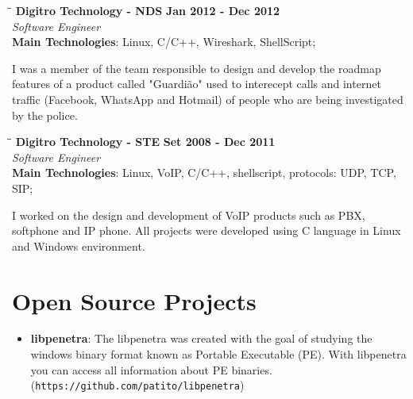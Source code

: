 \documentclass[margin]{res}
\begin{document}
\begin{resume}
   \begin{tabbing}
   \hspace{2.3in}\= \hspace{1.7in}\= \kill %
    \textbf{Digitro Technology - NDS}    \>\>\textbf{Jan 2012 - Dec 2012}\\
    \textit{Software Engineer}\\   
    \textbf{Main Technologies}: Linux, C/C++, Wireshark, ShellScript;
   \end{tabbing}\vspace{-20pt}      %
    \vspace{2mm}
    I was a member of the team responsible to design and develop the roadmap features of a product called
    "Guardião" used to interecept calls and internet traffic (Facebook, WhatsApp and Hotmail) of people who are 
    being investigated by the police.

   \begin{tabbing}
   \hspace{2.3in}\= \hspace{1.5in}\= \kill %
    \textbf{Digitro Technology - STE}    \>\>\textbf{Set 2008 - Dec 2011}\\
    \textit{Software Engineer}\\   
    \textbf{Main Technologies}: Linux, VoIP, C/C++, shellscript, protocols: UDP, TCP, SIP;
   \end{tabbing}\vspace{-20pt}      %
    \vspace{2mm}
    
    I worked on the design and development of VoIP products such as PBX, softphone and IP phone. 
    All projects were developed using C language in Linux and Windows environment.


\vspace{10mm}     

\section{Open Source Projects}
		\begin{itemize}
		    \vspace{2mm}
		    \item \textbf{libpenetra}: The libpenetra was created with the goal of studying the windows binary format 
		                               known as Portable Executable (PE). With libpenetra you can access all information
		                               about PE binaries. (\texttt{https://github.com/patito/libpenetra}) \vspace{1mm}
		                               

\end{itemize}
\end{resume}
\end{document}
